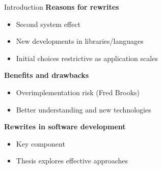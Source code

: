 \begin{frame}{Introduction}
        \textbf{Reasons for rewrites}
        \begin{itemize}
            \item Second system effect
            \item New developments in libraries/languages
            \item Initial choices restrictive as application scales
        \end{itemize}
        \pause
        \textbf{Benefits and drawbacks}
        \begin{itemize}
            \item Overimplementation risk (Fred Brooks)
            \item Better understanding and new technologies
        \end{itemize}
        \pause
        \textbf{Rewrites in software development}
        \begin{itemize}
            \item Key component
            \item Thesis explores effective approaches
        \end{itemize}
\end{frame}